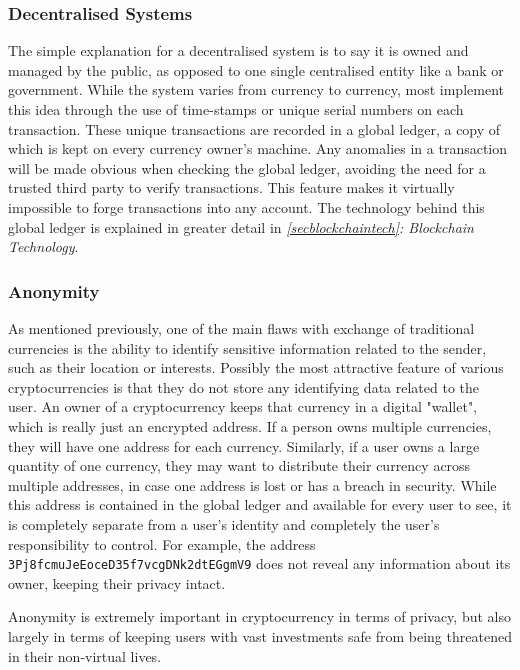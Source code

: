 \subsubsection{Decentralised Systems}\label{decentralised}
The simple explanation for a decentralised system is to say it is owned and managed by the public, as opposed to one single centralised entity like a bank or government. While the system varies from currency to currency, most implement this idea through the use of time-stamps or unique serial numbers on each transaction. These unique transactions are recorded in a global ledger, a copy of which is kept on every currency owner's machine. Any anomalies in a transaction will be made obvious when checking the global ledger, avoiding the need for a trusted third party to verify transactions. This feature makes it virtually impossible to forge transactions into any account. The technology behind this global ledger is explained in greater detail in \textit{\ref{secblockchaintech}: Blockchain Technology}.

\subsubsection{Anonymity}\label{anoncrypto}
As mentioned previously, one of the main flaws with exchange of traditional currencies is the ability to identify sensitive information related to the sender, such as their location or interests. Possibly the most attractive feature of various cryptocurrencies is that they do not store any identifying data related to the user. An owner of a cryptocurrency keeps that currency in a digital "wallet", which is really just an encrypted address. If a person owns multiple currencies, they will have one address for each currency. Similarly, if a user owns a large quantity of one currency, they may want to distribute their currency across multiple addresses, in case one address is lost or has a breach in security. While this address is contained in the global ledger and available for every user to see, it is completely separate from a user's identity and completely the user's responsibility to control. For example, the address \textcolor{OliveGreen}{\texttt{3Pj8fcmuJeEoceD35f7vcgDNk2dtEGgmV9}} does not reveal any information about its owner, keeping their privacy intact.

Anonymity is extremely important in cryptocurrency in terms of privacy, but also largely in terms of keeping users with vast investments safe from being threatened in their non-virtual lives.

